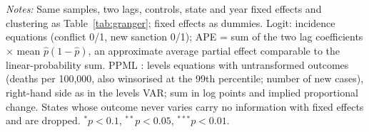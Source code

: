 \begin{table}[htbp]
\begin{threeparttable}
\begin{tablenotes}[flushleft]
\item \textit{Notes:} Same samples, two lags, controls, state and year fixed effects and clustering as Table~\ref{tab:granger}; fixed effects as dummies. Logit: incidence equations (conflict 0/1, new sanction 0/1); APE = sum of the two lag coefficients $\times$ mean $\hat p(1-\hat p)$, an approximate average partial effect comparable to the linear-probability sum. PPML \citep{santossilva2006}: levels equations with untransformed outcomes (deaths per 100,000, also winsorised at the 99th percentile; number of new cases), right-hand side as in the levels VAR; sum in log points and implied proportional change. States whose outcome never varies carry no information with fixed effects and are dropped. $^{*}p<0.1$, $^{**}p<0.05$, $^{***}p<0.01$.
\end{tablenotes}
\end{threeparttable}
\end{table}
